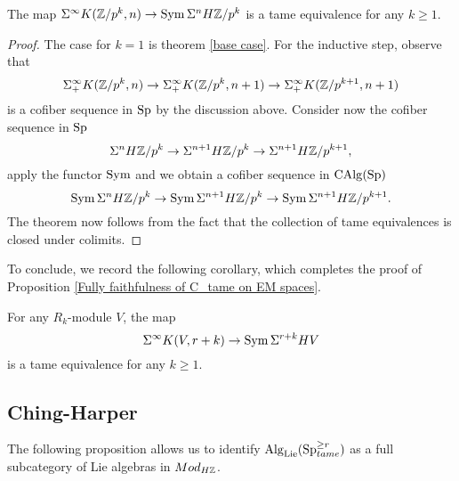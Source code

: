 \begin{theorem}
	The map $\Sigma^{\infty}K({\mathbb{Z}}/p^k,n) \to 
	\operatorname{Sym} \Sigma^nH{\mathbb{Z}}/{p^k}$ is a tame equivalence for any $k\geq 1$.
\end{theorem}
\begin{proof}
	The case for $k=1$ is theorem \ref{base case}.
	For the inductive step, observe that 
	\[
		\Sigma^{\infty}_{+}K({\mathbb{Z}}/p^k,n)\to 
\Sigma^{\infty}_{+}K({\mathbb{Z}}/p^k,n+1)
\to 
\Sigma^{\infty}_{+}
K({\mathbb{Z}}/p^{k+1},n+1)
\]
is a cofiber sequence in $\operatorname{Sp}$ by the discussion above.
Consider now the cofiber sequence in $\operatorname{Sp}$
\[
\Sigma^nH{\mathbb{Z}}/{p^k}\to \Sigma^{n+1}H{\mathbb{Z}}/{p^k}
\to 
\Sigma^{n+1}H{\mathbb{Z}}/{p^{k+1}},
\]
apply the functor $\operatorname{Sym}$ and we obtain a cofiber sequence in $\operatorname{CAlg}(\operatorname{Sp})$
\[
\operatorname{Sym}\Sigma^nH{\mathbb{Z}}/{p^k}\to 
\operatorname{Sym}\Sigma^{n+1}H{\mathbb{Z}}/{p^k}
\to 
\operatorname{Sym}
\Sigma^{n+1}H{\mathbb{Z}}/{p^{k+1}}.
\]
The theorem now follows from the fact that the collection of tame equivalences is closed under colimits.

\end{proof}

To conclude, we record the following corollary, which completes the proof of Proposition \ref{Fully faithfulness of C_tame on EM spaces}.
\begin{corollary}
\label{Suspension of Eilenberg-Maclane spaces are symmetric algebra}
	For any $R_k$-module $V$, the map 
	$$\Sigma^{\infty}K(V,r+k) \to 
	\operatorname{Sym} \Sigma^{r+k}HV$$ is a tame equivalence for any $k\geq 1$.
\end{corollary}
\subsection{Ching-Harper}










The following proposition allows us to identify $\operatorname{Alg}_{\operatorname{Lie}}(\operatorname{Sp}^{\geq r}_{tame})$ as a full subcategory of Lie algebras in $Mod_{H{\mathbb{Z}}}$.




